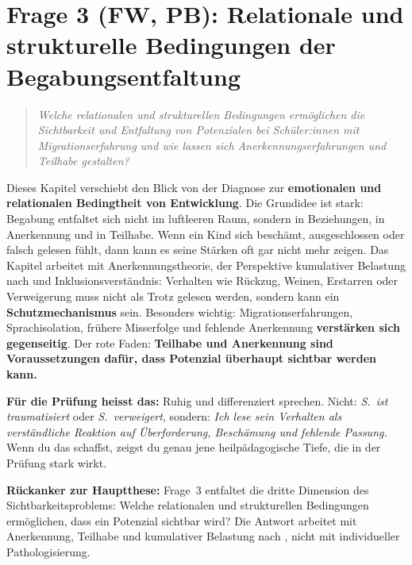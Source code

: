 \documentclass[ngerman, a4paper]{article}
\begin{document}
\newpage
\section{Frage 3 (FW, PB): Relationale und strukturelle Bedingungen
  der Begabungsentfaltung}
\label{sec:frage3}
 
\begin{quote}\itshape
Welche relationalen und strukturellen Bedingungen ermöglichen die
Sichtbarkeit und Entfaltung von Potenzialen bei Schüler:innen mit
Migrationserfahrung und wie lassen sich Anerkennungserfahrungen
und Teilhabe gestalten?
\end{quote}

\begin{kapitelueberblick}
Dieses Kapitel verschiebt den Blick von der Diagnose zur \textbf{emotionalen und relationalen Bedingtheit von Entwicklung}. Die Grundidee ist stark: Begabung entfaltet sich nicht im luftleeren Raum, sondern in Beziehungen, in Anerkennung und in Teilhabe. Wenn ein Kind sich beschämt, ausgeschlossen oder falsch gelesen fühlt, dann kann es seine Stärken oft gar nicht mehr zeigen. Das Kapitel arbeitet mit Anerkennungstheorie, der Perspektive kumulativer Belastung nach \textcite[S.\,86--98]{behrensen2019inklusive} und Inklusionsverständnis: Verhalten wie Rückzug, Weinen, Erstarren oder Verweigerung muss nicht als Trotz gelesen werden, sondern kann ein \textbf{Schutzmechanismus} sein. Besonders wichtig: Migrationserfahrungen, Sprachisolation, frühere Misserfolge und fehlende Anerkennung \textbf{verstärken sich gegenseitig}. Der rote Faden: \textbf{Teilhabe und Anerkennung sind Voraussetzungen dafür, dass Potenzial überhaupt sichtbar werden kann.}

\medskip\textbf{Für die Prüfung heisst das:} Ruhig und differenziert sprechen. Nicht: \textit{S.\ ist traumatisiert} oder \textit{S.\ verweigert}, sondern: \textit{Ich lese sein Verhalten als verständliche Reaktion auf Überforderung, Beschämung und fehlende Passung.} Wenn du das schaffst, zeigst du genau jene heilpädagogische Tiefe, die in der Prüfung stark wirkt.

\medskip\textbf{Rückanker zur Hauptthese:} Frage~3 entfaltet die dritte Dimension des Sichtbarkeitsproblems: Welche relationalen und strukturellen Bedingungen ermöglichen, dass ein Potenzial sichtbar wird? Die Antwort arbeitet mit Anerkennung, Teilhabe und kumulativer Belastung nach \textcite[S.\,86--98]{behrensen2019inklusive}, nicht mit individueller Pathologisierung.
\end{kapitelueberblick}
\end{document}

